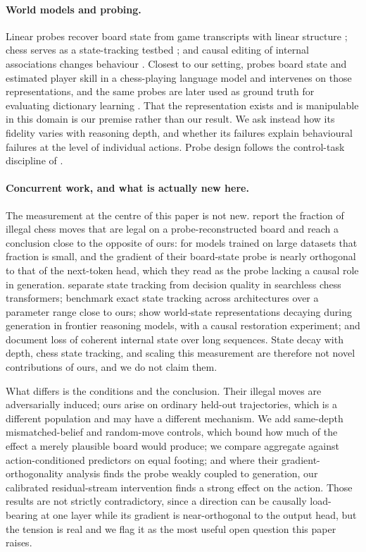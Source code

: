 \documentclass[11pt]{article}
\theoremstyle{remark}
\begin{document}
\paragraph{World models and probing.}
Linear probes recover board state from game transcripts \citep{li2023emergent}
with linear structure \citep{nanda2023emergent}; chess serves as a state-tracking
testbed \citep{toshniwal2022chess}; and causal editing of internal associations
changes behaviour \citep{meng2022locating}. Closest to our setting,
\citet{karvonen2024emergent} probes board state and estimated player skill in a
chess-playing language model and intervenes on those representations, and the
same probes are later used as ground truth for evaluating dictionary learning
\citep{karvonen2024measuring}. That the representation exists and is manipulable
in this domain is our premise rather than our result. We ask instead how its
fidelity varies with reasoning depth, and whether its failures explain
behavioural failures at the level of individual actions. Probe design follows the
control-task discipline of \citet{hewitt2019designing}.

\paragraph{Concurrent work, and what is actually new here.}
The measurement at the centre of this paper is not new.
\citet{balogh2026verification} report the fraction of illegal chess moves that
are legal on a probe-reconstructed board and reach a conclusion close to the
opposite of ours: for models trained on large datasets that fraction is small,
and the gradient of their board-state probe is nearly orthogonal to that of the
next-token head, which they read as the probe lacking a causal role in
generation. \citet{li2026tracking} separate state tracking from decision quality
in searchless chess transformers; \citet{walker2026chess} benchmark exact state
tracking across architectures over a parameter range close to ours;
\citet{pereira2026transformers} show world-state representations decaying during
generation in frontier reasoning models, with a causal restoration experiment;
and \citet{harang2025tracking} document loss of coherent internal state over long
sequences. State decay with depth, chess state tracking, and scaling this
measurement are therefore not novel contributions of ours, and we do not claim
them.

What differs is the conditions and the conclusion. Their illegal moves are
adversarially induced; ours arise on ordinary held-out trajectories, which is a
different population and may have a different mechanism. We add same-depth
mismatched-belief and random-move controls, which bound how much of the effect a
merely plausible board would produce; we compare aggregate against
action-conditioned predictors on equal footing; and where their
gradient-orthogonality analysis finds the probe weakly coupled to generation, our
calibrated residual-stream intervention finds a strong effect on the action.
Those results are not strictly contradictory, since a direction can be causally
load-bearing at one layer while its gradient is near-orthogonal to the output
head, but the tension is real and we flag it as the most useful open question
this paper raises.
\end{document}
